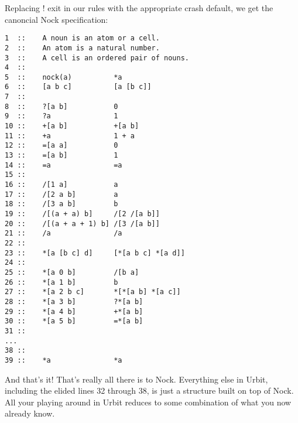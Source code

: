 Replacing ! exit in our rules with the appropriate crash default, we get the canoncial Nock specification:

\begin{framed_shaded}
\begin{Verbatim}[fontsize=\relsize{-2.5},commandchars=\\\{\}]
1  ::    A noun is an atom or a cell.
2  ::    An atom is a natural number.
3  ::    A cell is an ordered pair of nouns.
4  ::
5  ::    nock(a)          *a
6  ::    [a b c]          [a [b c]]
7  ::
8  ::    ?[a b]           0
9  ::    ?a               1
10 ::    +[a b]           +[a b]
11 ::    +a               1 + a
12 ::    =[a a]           0
13 ::    =[a b]           1
14 ::    =a               =a
15 ::
16 ::    /[1 a]           a
17 ::    /[2 a b]         a
18 ::    /[3 a b]         b
19 ::    /[(a + a) b]     /[2 /[a b]]
20 ::    /[(a + a + 1) b] /[3 /[a b]]
21 ::    /a               /a
22 ::
23 ::    *[a [b c] d]     [*[a b c] *[a d]]
24 ::
25 ::    *[a 0 b]         /[b a]
26 ::    *[a 1 b]         b
27 ::    *[a 2 b c]       *[*[a b] *[a c]]
28 ::    *[a 3 b]         ?*[a b]
29 ::    *[a 4 b]         +*[a b]
30 ::    *[a 5 b]         =*[a b]
31 ::
...
38 ::
39 ::    *a               *a
\end{Verbatim}
\end{framed_shaded}

And that's it! That's really all there is to Nock. Everything else in Urbit, including the elided lines 32 through 38, is just a structure built on top of Nock. All your playing around in Urbit reduces to some combination of what you now already know.